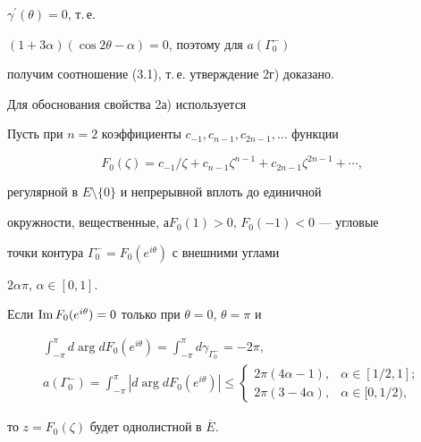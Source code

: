 $\gamma^\prime(\theta)=0$, т.\,е.\linebreak


$(1+3\alpha)(\cos 2\theta-\alpha)=0$, поэтому для $a({\Gamma }_0^{-})$


получим соотношение (3.1), т.\,е. утверждение 2г) доказано.





Для обоснования свойства 2а) используется





\begin{lem}


Пусть при $n=2$ коэффициенты $c_{-1}, c_{n-1},


c_{2n-1}, \dotsc$ функции


\begin{equation}


F_0(\zeta)=c_{-1}/\zeta+c_{n-1}\zeta^{n-1}+c_{2n-1}\zeta^{2


n-1}+\dotsb, 


\end{equation}


регулярной в $E\setminus\{0\}$ и непрерывной вплоть до единичной


окружности, вещественные, а\linebreak $F_0(1)>0$, $F_0(-1)<0$ --- угловые


точки контура ${\Gamma }_0^{-}=F_0(e^{i\theta})$ с внешними углами


$2\alpha\pi$, $\alpha\in[0,1]$.





Если $\operatorname{Im} F_0(e^{i\theta})=0$ только при $\theta=0$, $\theta=\pi$ и


\begin{gather}


\int_{-\pi}^\pi d\arg dF_0(e^{i\theta})=\int_{-\pi}^\pi{d\gamma_{


{\Gamma }_0^{-}}}=-2\pi,\\


%


a({\Gamma }_0^{-})=\int_{-\pi}^\pi|d\arg dF_0(e^{i\theta})|\le


\begin{cases}2\pi(4\alpha-1), & \alpha\in[1/2,1];\\


2\pi(3-4\alpha), & \alpha\in[0,1/2),


\end{cases}


\end{gather}


то $z=F_0(\zeta)$ будет однолистной в $\overline E$.


\end{lem}





